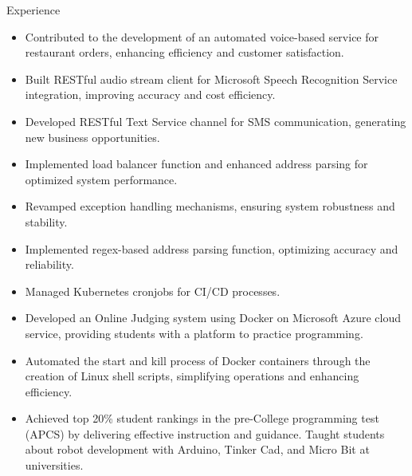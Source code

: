 \documentclass{resume} %
\begin{document}
\begin{workSection}{Experience}
    \experienceItem[
        company=Novo Labs Inc,
        location=Dallas{,} TX,
        position=Software Engineer,
        duration=Feb 2021 – Jun 2023
    ]
    \vspace{-0.65em}
    \begin{itemize}
    \itemsep -6pt {} 
    \item Contributed to the development of an automated voice-based service for restaurant orders, enhancing efficiency and customer satisfaction.
    \item Built RESTful audio stream client for Microsoft Speech Recognition Service integration, improving accuracy and cost efficiency.
    \item Developed RESTful Text Service channel for SMS communication, generating new business opportunities.
    \item Implemented load balancer function and enhanced address parsing for optimized system performance.
    \item Revamped exception handling mechanisms, ensuring system robustness and stability.
    \item Implemented regex-based address parsing function, optimizing accuracy and reliability.
    \item Managed Kubernetes cronjobs for CI/CD processes.
    \end{itemize}
     
    \experienceItem[
        company=CodePro Education \& Universities,
        location=Taichung{,} Taiwan,
        position=Software Engineer \& CS Lecturer,
        duration=Dec 2019 – Dec 2020
    ]
    \vspace{-0.65em}
    \begin{itemize}
        \itemsep -6pt {} 
        \item Developed an Online Judging system using Docker on Microsoft Azure cloud service, providing students with a platform to practice programming.
        \item Automated the start and kill process of Docker containers through the creation of Linux shell scripts, simplifying operations and enhancing efficiency.
        \item Achieved top 20\% student rankings in the pre-College programming test (APCS) by delivering effective instruction and guidance. Taught students about robot development with Arduino, Tinker Cad, and Micro Bit at universities.
     \end{itemize}


\end{workSection}
\end{document}

